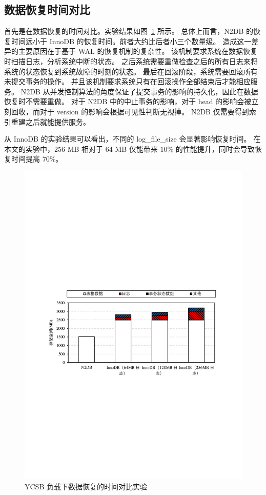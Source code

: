 \subsection{数据恢复时间对比}

首先是在数据恢复的时间对比。实验结果如图~\ref{fig:recovery-time-ycsb} 所示。
总体上而言，N2DB 的恢复时间远小于 InnoDB 的恢复时间。前者大约比后者小三个数量级。
造成这一差异的主要原因在于基于 WAL 的恢复机制的复杂性。
该机制要求系统在数据恢复时扫描日志，分析系统中断的状态。
之后系统需要重做检查之后的所有日志来将系统的状态恢复到系统故障的时刻的状态。
最后在回滚阶段，系统需要回滚所有未提交事务的操作。
并且该机制要求系统只有在回滚操作全部结束后才能相应服务。
N2DB 从并发控制算法的角度保证了提交事务的影响的持久化，因此在数据恢复时不需要重做。
对于 N2DB 中的中止事务的影响，对于 head 的影响会被立刻回收，而对于 version 的影响会根据可见性判断无视掉。
N2DB 仅需要得到索引重建之后就能提供服务。

从 InnoDB 的实验结果可以看出，不同的 log\_file\_size 会显著影响恢复时间。
在本文的实验中，256 MB 相对于 64 MB 仅能带来 $10\%$ 的性能提升，同时会导致恢复时间提高 $70\%$。


\begin{figure}
    \centering
    \includegraphics[width=15cm, trim={1cm 9cm 1cm 10cm}]{figures/recovery-time.pdf}
    \caption{YCSB 负载下数据恢复的时间对比实验}
    \label{fig:recovery-time-ycsb}
\end{figure}

